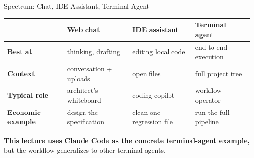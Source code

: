 \documentclass[10pt,english,aspectratio=169]{beamer}
\begin{document}
\begin{frame}{Spectrum: Chat, IDE Assistant, Terminal Agent}
\begin{center}
\small
\begin{tabular}{|p{2.5cm}|p{3.0cm}|p{3.2cm}|p{3.6cm}|}
\hline
& \textbf{Web chat} & \textbf{IDE assistant} & \textbf{Terminal agent} \\ \hline
\textbf{Best at} & thinking, drafting & editing local code & end-to-end execution \\ \hline
\textbf{Context} & conversation + uploads & open files & full project tree \\ \hline
\textbf{Typical role} & architect's whiteboard & coding copilot & workflow operator \\ \hline
\textbf{Economic example} & design the specification & clean one regression file & run the full pipeline \\ \hline
\end{tabular}
\end{center}

\vspace{0.25cm}

\textbf{This lecture uses Claude Code as the concrete terminal-agent example,} but the workflow generalizes to other terminal agents.
\end{frame}
\end{document}
